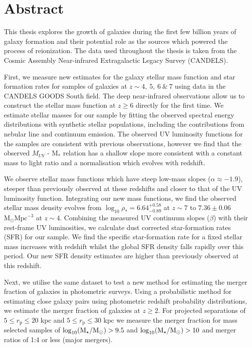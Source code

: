 %
%

\chapter*{Abstract}

This thesis explores the growth of galaxies during the first few billion years of galaxy formation and their potential role as the sources which powered the process of reionization. The data used throughout the thesis is taken from the Cosmic Assembly Near-infrared Extragalactic Legacy Survey (CANDELS).

First, we measure new estimates for the galaxy stellar mass function and star formation rates for samples of galaxies at $z \sim 4,~5,~6~\&~7$ using data in the CANDELS GOODS South field. The deep near-infrared observations allow us to construct the stellar mass function at $z \geq 6$ directly for the first time. We estimate stellar masses for our sample by fitting the observed spectral energy distributions with synthetic stellar populations, including the contributions from nebular line and continuum emission. The observed UV luminosity functions for the samples are consistent with previous observations, however we find that the observed $M_{UV}$ - M$_{*}$ relation has a shallow slope more consistent with a constant mass to light ratio and a normalisation which evolves with redshift. 

We observe stellar mass functions which have steep low-mass slopes ($\alpha \approx -1.9$), steeper than previously observed at these redshifts and closer to that of the UV luminosity function. Integrating our new mass functions, we find the observed stellar mass density evolves from $\log_{10} \rho_{*} = 6.64^{+0.58}_{-0.89}$ at $z \sim 7$ to  $7.36\pm0.06$ $\text{M}_{\odot} \text{Mpc}^{-3}$ at $z \sim 4$. Combining the measured UV continuum slopes ($\beta$) with their rest-frame UV luminosities, we calculate dust corrected star-formation rates (SFR) for our sample. We find the specific star-formation rate for a fixed stellar mass increases with redshift whilst the global SFR density falls rapidly over this period. Our new SFR density estimates are higher than previously observed at this redshift.

Next, we utilise the same dataset to test a new method for estimating the merger fraction of galaxies in photometric surveys. Using a probabilistic method for estimating close galaxy pairs using photometric redshift probability distributions, we estimate the merger fraction of galaxies at $z\geq 2$. For projected separations of $5 \leq r_{\text{p}} \leq 20$ kpc and $5 \leq r_{\text{p}} \leq 30$ kpc we measure the merger fraction for mass selected samples of $\log_{10}(\text{M}_{\star}/\text{M}_{\odot}) > 9.5$ and $\log_{10}(\text{M}_{\star}/\text{M}_{\odot}) > 10$ and merger ratios of 1:4 or less (major mergers).


